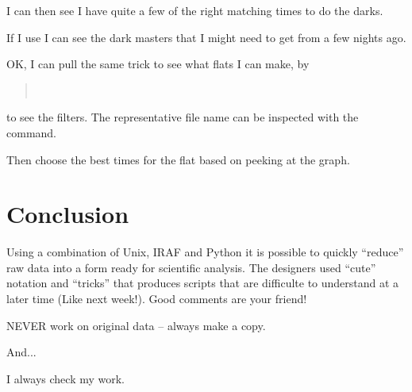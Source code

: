 \documentclass[letter,11pt,oneside]{article}
\begin{document}
I can then see I have quite a few of the right matching times to do the darks.

If I use {\color{verbcolor}{\verb#IMAGETYP ?= object#}} I can see the
dark masters that I might need to get from a few nights ago.

OK, I can pull the same trick to see what flats I can make, by

\begin{quote}
{\color{verbcolor}{\verb#hselect c_*fits $I,EXPTIME,XBINNING,YBINNING,FILTER "(IMAGETYP ?= 'dark')" > l.l#}}\\
{\color{verbcolor}{\verb#!sort -n -k 2 l.l ! uniq -c -f 1#}}
\end{quote}

to see the filters. The representative file name can be inspected
with the {\color{verbcolor}{\verb#stdas/histogram#}} command.

\begin{quote}
{\color{verbcolor}{\verb#histogram c_rep_flat_ha.fits filline+#}}
\end{quote}

Then choose the best times for the flat based on peeking at the
graph.







\section{Conclusion}

Using a combination of Unix, IRAF and Python it is possible to quickly
``reduce'' raw data into a form ready for scientific analysis. The
designers used ``cute'' notation and ``tricks'' that produces
scripts that are difficulte to understand at a later time (Like next
week!). Good comments {\color{verbcolor}{\verb=#=}} are your friend!

NEVER work on original data -- always make a copy.

And...

I always check my work.

\end{document}
